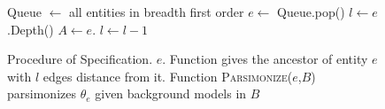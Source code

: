 \begin{figure}[!t]
\centering
\begin{algorithm}[H]
\captionsetup{labelformat=empty}
\begin{algorithmic}[1]
\State Queue $\gets$ all entities in breadth first order
  \State $e \gets$ Queue.pop()
  \State $l \gets e$.Depth()
    \State $A \gets e$.
    \State {}
    \State $l \gets l-1$  
  \EndWhile
\EndWhile
\EndProcedure
\end{algorithmic}
\end{algorithm}
\caption{\label{alg:specification_stage}Procedure of Specification. $e$. Function  gives the ancestor of entity $e$ with $l$ edges distance from it. Function \textsc{Parsimonize}($e$,$B$)  parsimonizes $\theta_e$ given background models in $B$}
\end{figure}